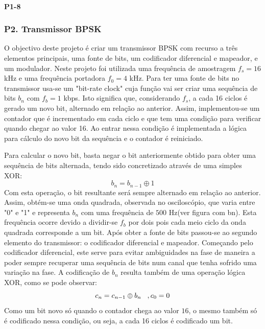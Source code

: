 \documentclass[11pt]{article}
\begin{document}
\paragraph{P1-8}
\label{para:P1-8}

\subsubsection{P2. Transmissor BPSK}

O objectivo deste projeto é criar um transmissor BPSK com recurso a três elementos principais, uma fonte de bits, um codificador diferencial e mapeador, e um modulador.
Neste projeto foi utilizada uma frequência de amostragem $f_s=16$ kHz e uma frequência portadora $f_0=4$ kHz.
\vfill
Para ter uma fonte de bits no transmissor usa-se um "bit-rate clock" cuja função vai ser criar uma sequência de bits $ b_n $ com $f_b=1$ kbps. Isto significa que, considerando $f_s$, a cada 16 ciclos é gerado um novo bit, alternado em relação ao anterior. Assim, implementou-se um contador que é incrementado em cada ciclo  e que tem uma condição para verificar quando chegar ao valor 16. Ao entrar nessa condição é implementada a lógica para cálculo do novo bit da sequência e o contador é reiniciado.

Para calcular o novo bit, basta negar o bit anteriormente obtido para obter uma sequência de bits alternada, tendo sido concretizado através de uma simples XOR:
\begin{equation}
b_n=b_{n-1} \oplus 1
\end{equation}
Com esta operação, o bit resultante será sempre alternado em relação ao anterior.
Assim, obtém-se uma onda quadrada, observada no osciloscópio, que varia entre "0" e "1" e representa $ b_n $  com uma frequência de $500$ Hz(ver figura com bn). Esta frequência ocorre devido a dividir-se  $f_b$ por dois pois cada meio ciclo da onda quadrada corresponde a um bit.  
\vfill
Após obter a fonte de bits passou-se ao segundo elemento do transmissor: o codificador diferencial e mapeador. Começando pelo codificador diferencial, este serve para evitar ambiguidades na fase de maneira a poder sempre recuperar uma sequência de bits num canal que tenha sofrido uma variação na fase.
A codificação de $b_n$ resulta também de uma operação lógica XOR, como se pode observar: 
\begin{equation}
c_n=c_{n-1} \oplus b_n \hspace{3 mm} ,c_0=0
\end{equation}
Como um bit novo só quando o contador chega ao valor $16$, o mesmo também só é codificado nessa condição, ou seja, a cada 16 ciclos é codificado um bit. 
\end{document}
